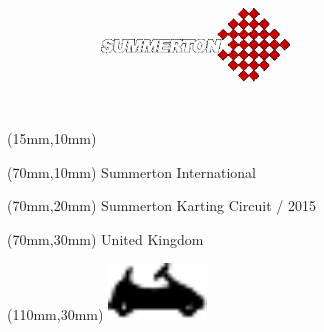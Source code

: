 \null\newpage
\begin{textblock*}{50mm}(15mm,10mm)%
\includegraphics[width=50mm]{LG/SUM.png}
\end{textblock*}
\begin{textblock*}{130mm}(70mm,10mm)%
{\fontsize{20}{20}\selectfont Summerton International}\\
\end{textblock*}
\begin{textblock*}{120mm}(70mm,20mm)%
{\fontsize{16}{16}\selectfont Summerton Karting Circuit / 2015}\\
\end{textblock*}
\begin{textblock*}{120mm}(70mm,30mm)%
{\fontsize{12}{12}\selectfont United Kingdom}
\end{textblock*}
\begin{textblock*}{30mm}(110mm,30mm)%
\centering
\includegraphics[height=15mm]{icons/kart.pdf}
\end{textblock*}
